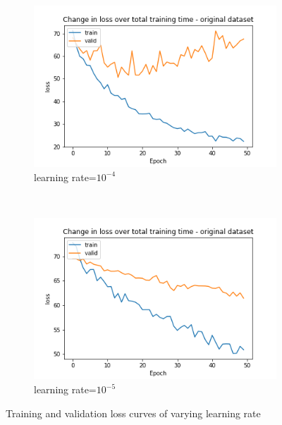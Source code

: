\begin{itemize}[leftmargin=*]
	\begin{figure}[htp]
     \begin{subfigure}[b]{0.5\linewidth}
         \centering
		\includegraphics[scale=0.5]{Figs/chap3/10-4.png}
		\caption{learning rate=$10^{-4}$}
		\label{fig:10-4}
     \end{subfigure}
     ~
     \begin{subfigure}[b]{0.5\linewidth}
         \centering
		\includegraphics[scale=0.5]{Figs/chap3/10-5.png}
		\caption{learning rate=$10^{-5}$}
		\label{fig:10-5}
     \end{subfigure}
  \caption{Training and validation loss curves of varying learning rate}
  \label{Fig:learning}
\end{figure}
\end{itemize}

